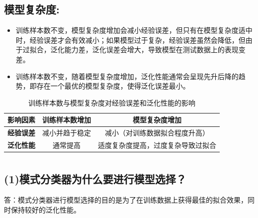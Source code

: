 \documentclass{article}
\begin{document}
\subsection{模型复杂度:}
\begin{itemize}
    \item 训练样本数不变，模型复杂度增加会减小经验误差，但只有在模型复杂度适中时，经验误差才会有效减小；如果模型过于复杂，经验误差虽然会降低，但由于过拟合，泛化能力差，泛化误差会增大，导致模型在测试数据上的表现变差。
    \item 训练样本数不变，随着模型复杂度增加，泛化性能通常会呈现先升后降的趋势，即存在一个最优的模型复杂度，使得泛化误差最小。
\end{itemize}

\begin{table}[ht]
    \centering
    \begin{tabular}{|c|c|c|}
    \hline
    \textbf{影响因素} & \textbf{训练样本数增加} & \textbf{模型复杂度增加} \\
    \hline
    \textbf{经验误差} & 减小并趋于稳定 & 减小（对训练数据拟合程度升高） \\
    \hline
    \textbf{泛化性能} & 通常提高 & 适度复杂度提高，过度复杂导致过拟合 \\
    \hline
    \end{tabular}
    \caption{训练样本数与模型复杂度对经验误差和泛化性能的影响}
\end{table}    
\section{}
\subsection{(1)模式分类器为什么要进行模型选择？}
答：模式分类器进行模型选择的目的是为了在训练数据上获得最佳的拟合效果，同时保持较好的泛化性能。
\end{document}
